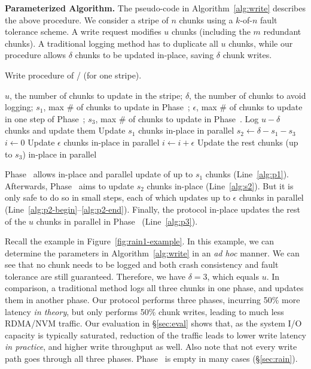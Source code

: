 \noindent
\textbf{Parameterized Algorithm.} The pseudo-code in Algorithm~\ref{alg:write} describes the above procedure.  
We consider a stripe of $n$
chunks using a $k$-of-$n$ fault tolerance scheme. A write request modifies $u$ chunks
(including the $m$ redundant chunks). A
traditional logging method has to duplicate all $u$ chunks, while our procedure
allows $\delta$ chunks to be updated in-place, saving $\delta$ chunk writes.

\begin{algorithm}[!t]
\caption{Write procedure of \protocol/ (for one stripe).}
\label{alg:write}
\begin{algorithmic}[1]
  \Require $u$, the number of chunks to update in the stripe; $\delta$, the
number of chunks to avoid logging; $s_1$, max \# of chunks to update in
Phase~; $\epsilon$, max \# of chunks to update in one step of
Phase~; $s_3$, max \# of chunks to update in Phase~.
  \State Log $u - \delta$ chunks and update them \label{alg:log}
  \State Update $s_1$ chunks in-place in parallel  \label{alg:p1}
    \State $s_2 \gets \delta - s_1 - s_3$  \label{alg:s2}
    \State $i \gets 0$ \label{alg:p2-begin}
	 
	  \State Update $\epsilon$ chunks in-place in parallel
      \State $i \gets i + \epsilon$
    \EndWhile \label{alg:p2-end}
  \EndIf
  \State Update the rest chunks (up to $s_3$) in-place in parallel  \label{alg:p3}
\end{algorithmic}
\end{algorithm}

Phase~ allows in-place and parallel update of up to $s_1$ chunks
(Line~\ref{alg:p1}).  Afterwards, Phase~ aims to update $s_2$
chunks in-place (Line~\ref{alg:s2}).  But it is only safe to do so in small
steps, each of which updates up to $\epsilon$ chunks in parallel
(Line~\ref{alg:p2-begin}--\ref{alg:p2-end}).  Finally, the protocol in-place updates the
rest of the $u$ chunks in parallel in Phase~
(Line~\ref{alg:p3}).

Recall the example in Figure~\ref{fig:rain1-example}. In this example, we can determine the parameters in Algorithm~\ref{alg:write} in an \emph{ad hoc} manner.
We can see that no chunk needs to be logged and both
crash consistency and fault tolerance are still guaranteed. Therefore,
we have $\delta=3$, which equals $u$.  In comparison,
a traditional method logs all three chunks in one phase, and updates them in
another phase.  Our protocol performs three phases, incurring 50\% more latency
\emph{in theory}, but only performs 50\% chunk writes, leading to much less
RDMA/NVM traffic. Our evaluation in
\S\ref{sec:eval} shows that, as the system I/O capacity is typically
saturated, reduction of the traffic leads to lower write latency \emph{in
practice}, and higher write throughput as well.  Also note that not every write
path goes through all three phases.  Phase~ is empty in many cases
(\S\ref{sec:rain}).

